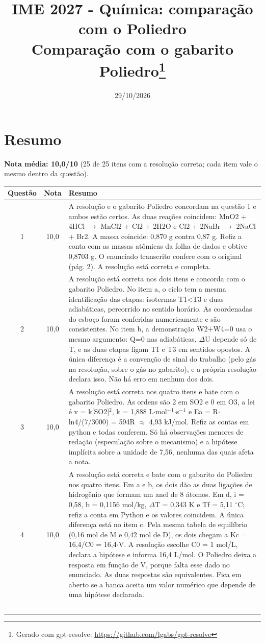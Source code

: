 \documentclass{article}%
\title{IME 2027 {-} Química: comparação com o Poliedro\\[4pt]\large Comparação com o gabarito Poliedro\thanks{Gerado com gpt-resolve: \url{https://github.com/lgabs/gpt-resolve}}}%
\date{29/10/2026}%
\begin{document}
%
\normalsize%
\maketitle%
\section*{Resumo}\textbf{Nota média: 10,0/10} (25 de 25 itens com a resolução correta; cada item vale o mesmo dentro da questão).\par\medskip%
\begin{longtable}{@{}c c p{}@{}}\toprule Questão & Nota & Resumo \\ \midrule
1 & 10,0 & A resolução e o gabarito Poliedro concordam na questão 1 e ambos estão certos. As duas reações coincidem: MnO2 + 4HCl $\to$ MnCl2 + Cl2 + 2H2O e Cl2 + 2NaBr $\to$ 2NaCl + Br2. A massa coincide: 0,870 g contra 0,87 g. Refiz a conta com as massas atômicas da folha de dados e obtive 0,8703 g. O enunciado transcrito confere com o original (pág. 2). A resolução está correta e completa. \\
2 & 10,0 & A resolução está correta nos dois itens e concorda com o gabarito Poliedro. No item a, o ciclo tem a mesma identificação das etapas: isotermas T1<T3 e duas adiabáticas, percorrido no sentido horário. As coordenadas do esboço foram conferidas numericamente e são consistentes. No item b, a demonstração W2+W4=0 usa o mesmo argumento: Q=0 nas adiabáticas, $\Delta$U depende só de T, e as duas etapas ligam T1 e T3 em sentidos opostos. A única diferença é a convenção de sinal do trabalho (pelo gás na resolução, sobre o gás no gabarito), e a própria resolução declara isso. Não há erro em nenhum dos dois. \\
3 & 10,0 & A resolução está correta nos quatro itens e bate com o gabarito Poliedro. As ordens são 2 em SO2 e 0 em O3, a lei é v = k{[}SO2{]}$^2$, k = 1,888 L$\cdot$mol$^{-}$$^{1}$$\cdot$s$^{-}$$^{1}$ e Ea = R$\cdot$ln4/(7/3000) = 594R $\approx$ 4,93 kJ/mol. Refiz as contas em python e todas conferem. Só há observações menores de redação (especulação sobre o mecanismo) e a hipótese implícita sobre a unidade de 7,56, nenhuma das quais afeta a nota. \\
4 & 10,0 & A resolução está correta e bate com o gabarito do Poliedro nos quatro itens. Em a e b, os dois dão as duas ligações de hidrogênio que formam um anel de 8 átomos. Em d, i = 0,58, b = 0,1156 mol/kg, $\Delta$T = 0,343 K e Tf = 5,11 $^\circ$C; refiz a conta em Python e os valores coincidem. A única diferença está no item c. Pela mesma tabela de equilíbrio (0,16 mol de M e 0,42 mol de D), os dois chegam a Kc = 16,4/C0 = 16,4$\cdot$V. A resolução escolhe C0 = 1 mol/L, declara a hipótese e informa 16,4 L/mol. O Poliedro deixa a resposta em função de V, porque falta esse dado no enunciado. As duas respostas são equivalentes. Fica em aberto se a banca aceita um valor numérico que depende de uma hipótese declarada. \\
$$
\end{longtable}
\end{document}

